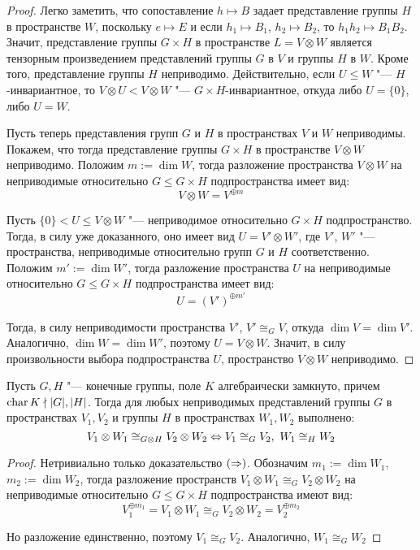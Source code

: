\begin{proof}
	Легко заметить, что сопоставление $h \mapsto B$ задает представление группы $H$ в пространстве $W$, поскольку $e \mapsto E$ и если $h_1 \mapsto B_1$, $h_2 \mapsto B_2$, то $h_1h_2 \mapsto B_1B_2$. Значит, представление группы $G \times H$ в пространстве $L = V \otimes W$ является тензорным произведением представлений группы $G$ в $V$ и группы $H$ в $W$. Кроме того, представление группы $H$ неприводимо. Действительно, если $U \le W$ "--- $H$-инвариантное, то $V \otimes U < V \otimes W$ "--- $G \times H$-инвариантное, откуда либо $U = \{0\}$, либо $U = W$.
	
	Пусть теперь представления групп $G$ и $H$ в пространствах $V$ и $W$ неприводимы. Покажем, что тогда представление группы $G \times H$ в пространстве $V \otimes W$ неприводимо. Положим $m := \dim{W}$, тогда разложение пространства $V \otimes W$ на неприводимые относительно $G \le G \times H$ подпространства имеет вид:
	\[V \otimes W = V^{\oplus m}\]
	
	Пусть $\{0\} < U \le V \otimes W$ "--- неприводимое относительно $G \times H$ подпространство. Тогда, в силу уже доказанного, оно имеет вид $U = V' \otimes W'$, где $V'$, $W'$ "--- пространства, неприводимые относительно групп $G$ и $H$ соответственно. Положим $m' := \dim{W'}$, тогда разложение пространства $U$ на неприводимые относительно $G \le G \times H$ подпространства имеет вид:
	\[U = (V')^{\oplus m'}\]
	
	Тогда, в силу неприводимости пространства $V'$, $V' \cong_G V$, откуда $\dim{V} = \dim{V'}$. Аналогично, $\dim{W} = \dim{W'}$, поэтому $U = V \otimes W$. Значит, в силу произвольности выбора подпространства $U$, пространство $V \otimes W$ неприводимо.
\end{proof}

\begin{theorem}
	Пусть $G, H$ "--- конечные группы, поле $K$ алгебраически замкнуто, причем $\operatorname{char}{K} \nmid |G|, |H|$. Тогда для любых неприводимых представлений группы $G$ в пространствах $V_1, V_2$ и группы $H$ в пространствах $W_1, W_2$ выполнено:
	\[V_1 \otimes W_1 \cong_{G \otimes H} V_2 \otimes W_2 \Leftrightarrow V_1 \cong_G V_2,~ W_1\cong_H W_2\]
\end{theorem}

\begin{proof}
	Нетривиально только доказательство $(\Rightarrow)$. Обозначим $m_1 := \dim{W_1}$, $m_2 := \dim{W_2}$, тогда разложение пространств $V_1 \otimes W_1 \cong_G V_2 \otimes W_2$ на неприводимые относительно $G \le G \times H$ подпространства имеют вид:
	\[V_1^{\oplus m_1} = V_1 \otimes W_1 \cong_G V_2 \otimes W_2 = V_2^{\oplus m_2}\]
	
	Но разложение единственно, поэтому $V_1 \cong_G V_2$. Аналогично, $W_1 \cong_G W_2$
\end{proof}
